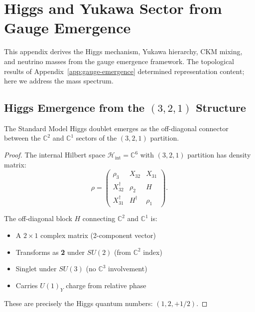 
\section{Higgs and Yukawa Sector from Gauge Emergence}\label{app:higgs-yukawa}

This appendix derives the Higgs mechanism, Yukawa hierarchy, CKM mixing, and neutrino masses from the gauge emergence framework. The topological results of Appendix~\ref{app:gauge-emergence} determined representation content; here we address the mass spectrum.

\subsection{Higgs Emergence from the $(3,2,1)$ Structure}\label{app:higgs-emergence}

\begin{theorem}\label{thm:higgs}
The Standard Model Higgs doublet emerges as the off-diagonal connector between the $\mathbb{C}^2$ and $\mathbb{C}^1$ sectors of the $(3,2,1)$ partition.
\end{theorem}

\begin{proof}
The internal Hilbert space $\mathcal{H}_{\text{int}} = \mathbb{C}^6$ with $(3,2,1)$ partition has density matrix:
\begin{equation}
\rho = \begin{pmatrix} 
\rho_3 & X_{32} & X_{31} \\
X_{32}^\dagger & \rho_2 & H \\
X_{31}^\dagger & H^\dagger & \rho_1
\end{pmatrix}.
\end{equation}

The off-diagonal block $H$ connecting $\mathbb{C}^2$ and $\mathbb{C}^1$ is:
\begin{itemize}
\item A $2 \times 1$ complex matrix (2-component vector)
\item Transforms as \textbf{2} under $SU(2)$ (from $\mathbb{C}^2$ index)
\item Singlet under $SU(3)$ (no $\mathbb{C}^3$ involvement)
\item Carries $U(1)_Y$ charge from relative phase
\end{itemize}

These are precisely the Higgs quantum numbers: $(1, 2, +1/2)$.
\end{proof}

